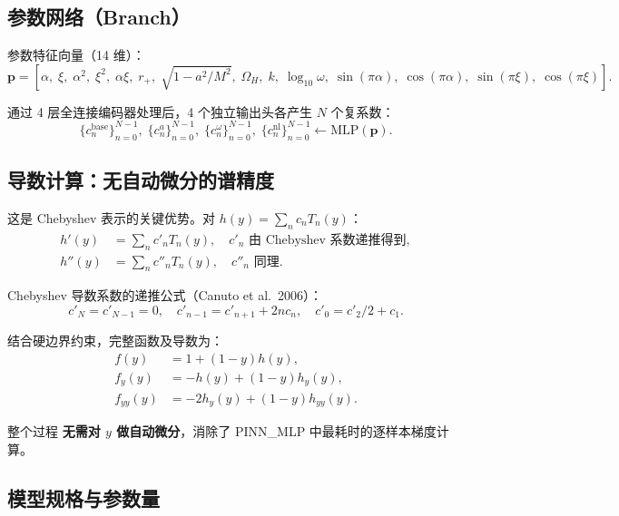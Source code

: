 \documentclass[11pt,a4paper]{article}
\begin{document}
\subsection{参数网络（Branch）}

参数特征向量（14 维）：
\begin{equation}
\mathbf{p} = [\alpha,\;\xi,\;\alpha^2,\;\xi^2,\;\alpha\xi,\;r_+,\;\sqrt{1-a^2/M^2},\;\Omega_H,\;k,\;\log_{10}\omega,\;
\sin(\pi\alpha),\;\cos(\pi\alpha),\;\sin(\pi\xi),\;\cos(\pi\xi)].
\end{equation}

\noindent 通过 4 层全连接编码器处理后，4 个独立输出头各产生 $N$ 个复系数：
\begin{equation}
\{c_n^{\text{base}}\}_{n=0}^{N-1},\;\{c_n^{a}\}_{n=0}^{N-1},\;
\{c_n^{\omega}\}_{n=0}^{N-1},\;\{c_n^{\text{nl}}\}_{n=0}^{N-1}
\leftarrow \text{MLP}(\mathbf{p}).
\end{equation}

\subsection{导数计算：无自动微分的谱精度}

这是 Chebyshev 表示的关键优势。对 $h(y) = \sum_n c_n T_n(y)$：
\begin{align}
h'(y) &= \sum_n c'_n T_n(y), \quad c'_n \text{ 由 Chebyshev 系数递推得到}, \\
h''(y) &= \sum_n c''_n T_n(y), \quad c''_n \text{ 同理}.
\end{align}

Chebyshev 导数系数的递推公式（Canuto et al.\ 2006）：
\begin{equation}
c'_{N}=c'_{N-1}=0,\quad c'_{n-1} = c'_{n+1} + 2n c_n,\quad c'_0 = c'_2/2 + c_1.
\end{equation}

结合硬边界约束，完整函数及导数为：
\begin{align}
f(y) &= 1 + (1-y)h(y), \label{eq:f} \\
f_y(y) &= -h(y) + (1-y)h_y(y), \label{eq:fy} \\
f_{yy}(y) &= -2h_y(y) + (1-y)h_{yy}(y). \label{eq:fyy}
\end{align}

整个过程 \textbf{无需对 $y$ 做自动微分}，消除了 PINN\_MLP 中最耗时的逐样本梯度计算。

\subsection{模型规格与参数量}
\end{document}
